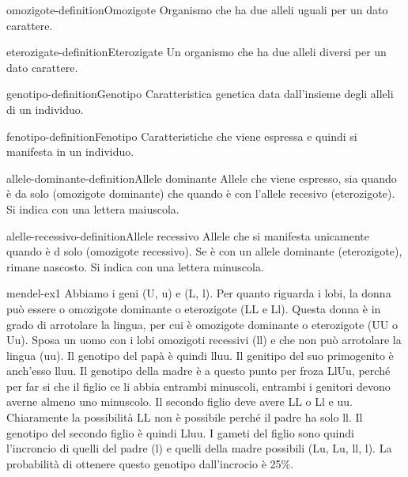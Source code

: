 \documentclass[preview]{standalone}
\begin{document}
\begin{snippetdefinition}{omozigote-definition}{Omozigote}
    Organismo che ha due alleli uguali per un dato carattere.
\end{snippetdefinition}

\begin{snippetdefinition}{eterozigate-definition}{Eterozigate}
    Un organismo che ha due alleli diversi per un dato carattere.
\end{snippetdefinition}

\begin{snippetdefinition}{genotipo-definition}{Genotipo}
    Caratteristica genetica data dall'insieme degli alleli di un individuo.
\end{snippetdefinition}

\begin{snippetdefinition}{fenotipo-definition}{Fenotipo}
    Caratteristiche che viene espressa e quindi si manifesta in un individuo.
\end{snippetdefinition}

\begin{snippetdefinition}{allele-dominante-definition}{Allele dominante}
    Allele che viene espresso, sia quando è da solo (omozigote dominante) che
    quando è con l'allele recesivo (eterozigote). Si indica con una lettera maiuscola.
\end{snippetdefinition}

\begin{snippetdefinition}{alelle-recessivo-definition}{Allele recessivo}
    Allele che si manifesta unicamente quando è d solo (omozigote recessivo).
    Se è con un allele dominante (eterozigote), rimane nascosto. Si indica con una lettera minuscola.
\end{snippetdefinition}


\begin{snippetexercise}{mendel-ex1}{}
    Abbiamo i geni (U, u) e (L, l).
    Per quanto riguarda i lobi, la donna può essere o omozigote dominante o eterozigote
    (LL e Ll). Questa donna è in grado di arrotolare la lingua, per cui è
    omozigote dominante o eterozigote (UU o Uu).
    Sposa un uomo con i lobi omozigoti recessivi (ll) e che non può arrotolare la lingua
    (uu). Il genotipo del papà è quindi lluu. Il genitipo del suo primogenito 
    è anch'esso lluu.
    Il genotipo della madre è a questo punto per froza LlUu, perché
    per far si che il figlio ce li abbia entrambi minuscoli, entrambi
    i genitori devono averne almeno uno minuscolo.
    Il secondo figlio deve avere LL o Ll e uu. Chiaramente la possibilità
    LL non è possibile perché il padre ha solo ll.
    Il genotipo del secondo figlio è quindi Lluu.
    I gameti del figlio sono quindi l'incroncio di quelli del padre (l)
    e quelli della madre possibili (Lu, Lu, ll, l).
    La probabilità di ottenere questo genotipo dall'incrocio è 25\%.
\end{snippetexercise}
\end{document}
